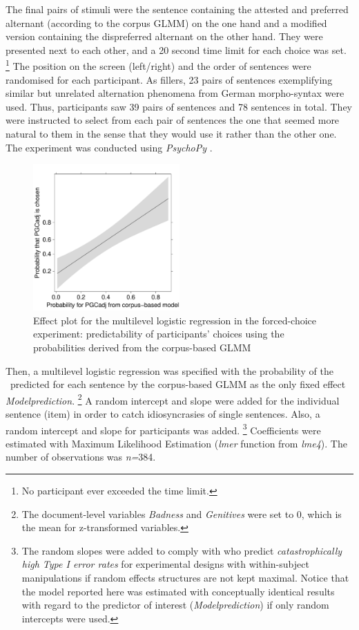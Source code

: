 The final pairs of stimuli were the sentence containing the attested and preferred alternant (according to the corpus GLMM) on the one hand and a modified version containing the dispreferred alternant on the other hand.
They were presented next to each other, and a 20 second time limit for each choice was set.%
\footnote{No participant ever exceeded the time limit.}
The position on the screen (left\slash right) and the order of sentences were randomised for each participant.
As fillers, 23 pairs of sentences exemplifying similar but unrelated alternation phenomena from German morpho-syntax were used.
Thus, participants saw 39 pairs of sentences and 78 sentences in total.
They were instructed to select from each pair of sentences the one that seemed more natural to them in the sense that they would use it rather than the other one.
The experiment was conducted using \textit{PsychoPy} \citep{Peirce2007}.

\begin{figure}[hb!]
\centering
\includegraphics[width=0.5\textwidth]{../R/output/fc_effects}
\caption{Effect plot for the multilevel logistic regression in the forced-choice experiment: predictability of participants' choices using the probabilities derived from the corpus-based GLMM}
\label{fig:afc:effects}
\end{figure}

Then, a multilevel logistic regression was specified with the probability of the \PGCa\ predicted for each sentence by the corpus-based GLMM as the only fixed effect \textit{Modelprediction}.%
\footnote{The document-level variables \textit{Badness} and \textit{Genitives} were set to 0, which is the mean for z-transformed variables.}
A random intercept and slope were added for the individual sentence (item) in order to catch idiosyncrasies of single sentences.
Also, a random intercept and slope for participants was added.%
\footnote{The random slopes were added to comply with \citet[257]{BarrEa2013} who predict \textit{catastrophically high Type I error rates} for experimental designs with within-subject manipulations if random effects structures are not kept maximal.
Notice that the model reported here was estimated with conceptually identical results with regard to the predictor of interest (\textit{Modelprediction}) if only random intercepts were used.}
Coefficients were estimated with Maximum Likelihood Estimation (\textit{lmer} function from \textit{lme4}).
The number of observations was \textit{n=}384.

